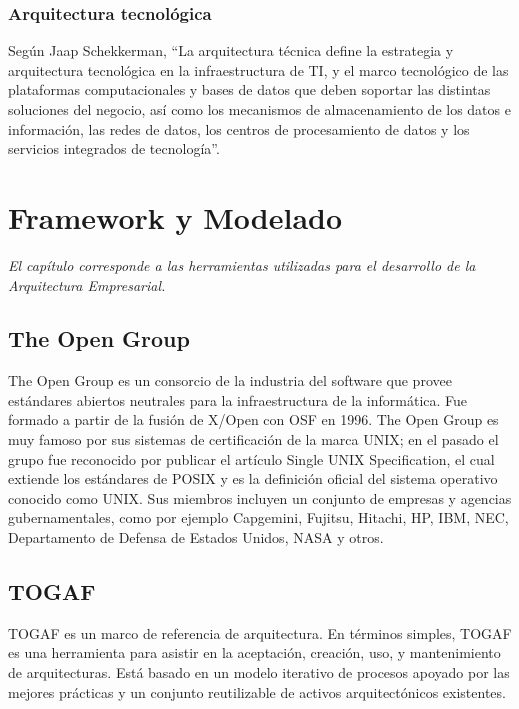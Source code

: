   \subsection{Arquitectura tecnológica}
  Según Jaap Schekkerman, “La arquitectura técnica define la estrategia y arquitectura tecnológica en la infraestructura de TI, y el marco tecnológico de las plataformas computacionales y bases de datos que deben soportar las distintas soluciones del negocio, así como los mecanismos de almacenamiento de los datos e información, las redes de datos, los centros de procesamiento de datos y los servicios integrados de tecnología”.
 
\chapter{Framework y Modelado}
\label{chap:Archimate}
\textit{El capítulo corresponde a las herramientas utilizadas para el desarrollo de la Arquitectura Empresarial.}
\vfill
\minitoc
\newpage

\section{The Open Group}
The Open Group es un consorcio de la industria del software que provee estándares abiertos neutrales para la infraestructura de la informática. Fue formado a partir de la fusión de X/Open con OSF en 1996. The Open Group es muy famoso por sus sistemas de certificación de la marca UNIX; en el pasado el grupo fue reconocido por publicar el artículo Single UNIX Specification, el cual extiende los estándares de POSIX y es la definición oficial del sistema operativo conocido como UNIX. Sus miembros incluyen un conjunto de empresas y agencias gubernamentales, como por ejemplo Capgemini, Fujitsu, Hitachi, HP, IBM, NEC, Departamento de Defensa de Estados Unidos, NASA y otros. \cite{ref10}

\section{TOGAF}
TOGAF es un marco de referencia de arquitectura. En términos simples, TOGAF es una herramienta para asistir en la aceptación, creación, uso, y mantenimiento de arquitecturas. Está basado en un modelo iterativo de procesos apoyado por las mejores prácticas y un conjunto reutilizable de activos arquitectónicos existentes. \\

